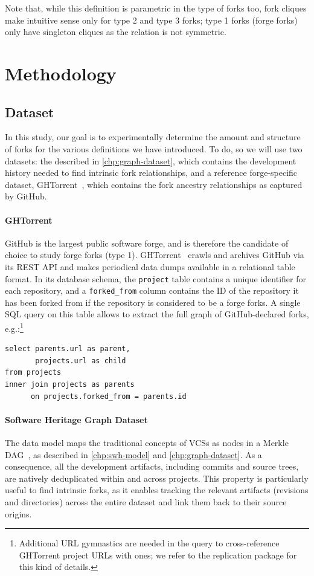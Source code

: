 Note that, while this definition is parametric in the type of forks too, fork
cliques make intuitive sense only for type 2 and type 3 forks; type 1 forks
(forge forks) only have singleton cliques as the relation is not symmetric.


\section{Methodology}%
\label{sec:forks-methodology}


\subsection{Dataset}%
\label{sec:forks-dataset}

In this study, our goal is to experimentally determine the amount and structure
of forks for the various definitions we have introduced. To do, so we will use
two datasets: the \SWHGD{} described in \cref{chp:graph-dataset}, which
contains the development history needed to find intrinsic fork relationships,
and a reference forge-specific dataset, GHTorrent~\cite{GHTorrent}, which
contains the fork ancestry relationships as captured by GitHub.

\paragraph{GHTorrent}
GitHub is the largest public software forge, and is therefore the candidate of
choice to study forge forks (type 1). GHTorrent~\cite{GHTorrent} crawls and
archives GitHub via its REST API and makes periodical data dumps available in a
relational table format. In its database schema, the \texttt{project} table
contains a unique identifier for each repository, and a \texttt{forked\_from}
column contains the ID of the repository it has been forked from if the
repository is considered to be a forge forks.  A single SQL query on this table
allows to extract the full graph of GitHub-declared forks,
e.g.:\footnote{Additional URL gymnastics are needed in the query to
cross-reference GHTorrent project URLs with \SWH{} ones; we refer to the
replication package for this kind of details.}
\begin{verbatim}
select parents.url as parent,
       projects.url as child
from projects
inner join projects as parents
      on projects.forked_from = parents.id
\end{verbatim}

\paragraph{Software Heritage Graph Dataset}
The \SWHGD{} data model maps the traditional concepts of \glspl{VCS} as nodes
in a Merkle DAG~\cite{Merkle}, as described in \cref{chp:swh-model} and
\cref{chp:graph-dataset}. As a consequence, all the development artifacts,
including commits and source trees, are natively deduplicated within and across
projects. This property is particularly useful to find intrinsic forks, as it
enables tracking the relevant artifacts (revisions and directories) across the
entire dataset and link them back to their source origins.

